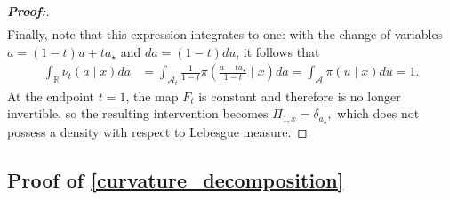 \documentclass[11pt,twoside]{article}
\theoremstyle{definition}
\theoremstyle{remark}
\begin{document}
\begin{proof}[\textbf{Proof:}]
\begin{align*}
\end{align*}
Finally, note that this expression integrates to one: with the change of variables $a = (1 - t)u + t a_\star$ and $da = (1 - t)du$, it follows that
\begin{align*}
    \int_{\mathbb{R}}\nu_t(a\mid x)da &= \int_{\mathcal{A}_{t}} \frac{1}{1-t} \pi\left( \frac{a-ta_\star}{1-t} \mid x \right)da = \int_{\mathcal{A}}\pi(u\mid x)du =1.
\end{align*}
At the endpoint $t=1$, the map $F_t$ is constant and therefore is no longer invertible, so the resulting intervention becomes $\Pi_{1,x} = \delta_{a_\star},$ which does not possess a density with respect to Lebesgue measure.
\end{proof}

\subsection{Proof of \cref{curvature_decomposition}} \label{curvature_decomposition_proof}
\end{document}
